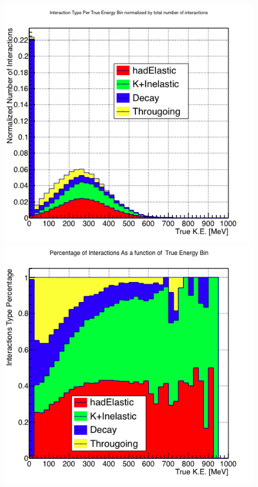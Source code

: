 \begin{figure}
\captionsetup{justification=raggedright}  
\begin{minipage}[b]{.53\textwidth}  
  \centering  
\includegraphics[scale=0.45]{./images/Lariat/InteractionBreakDown.png}
\end{minipage}%
\begin{minipage}[b]{0.53\textwidth}  
  \centering  
\includegraphics[scale=0.45]{./images/Lariat/PercentageIntType.png}

\end{minipage}
\end{figure}
